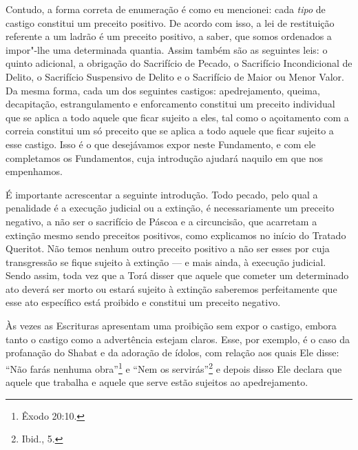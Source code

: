 Contudo, a forma correta de enumeração é como eu mencionei: cada
\emph{tipo} de castigo constitui um preceito positivo. De acordo com
isso, a lei de restituição referente a um ladrão é um preceito positivo,
a saber, que somos ordenados a impor"-lhe uma determinada quantia. Assim
também são as seguintes leis: o quinto adicional, a obrigação do
Sacrifício de Pecado, o Sacrifício
Incondicional de Delito, o Sacrifício Suspensivo de Delito e o
Sacrifício de Maior ou Menor Valor. Da mesma forma, cada um dos
seguintes castigos: apedrejamento, queima, decapitação, estrangulamento
e enforcamento constitui um preceito individual que se aplica a todo
aquele que ficar sujeito a eles, tal como o açoitamento com a correia
constitui um só preceito que se aplica a todo aquele que ficar sujeito a
esse castigo. Isso é o que desejávamos expor neste Fundamento, e com
ele completamos os Fundamentos, cuja introdução ajudará naquilo em que
nos empenhamos.

É importante acrescentar a seguinte introdução. Todo pecado, pelo qual a
penalidade é a execução judicial ou a extinção, é necessariamente um
preceito negativo, a não ser o sacrifício de Páscoa e a circuncisão, que
acarretam a extinção mesmo sendo preceitos positivos, como explicamos
no início do Tratado Queritot\starr. Não temos nenhum outro preceito positivo
a não ser esses por cuja transgressão se fique sujeito à extinção --- e
mais ainda, à execução judicial. Sendo assim, toda vez que a Torá\starr{}
disser que aquele que cometer um determinado ato deverá ser morto ou
estará sujeito à extinção saberemos perfeitamente que esse ato
específico está proibido e constitui um preceito negativo.

Às vezes as Escrituras apresentam uma proibição sem expor o castigo,
embora tanto o castigo como a advertência estejam claros. Esse, por
exemplo, é o caso da profanação do Shabat e da adoração de ídolos, com
relação aos quais Ele disse: ``Não farás nenhuma obra''\footnote{Êxodo 20:10.} e
``Nem os servirás''\footnote{Ibid., 5.} e depois disso Ele declara que aquele
que trabalha e aquele que serve estão sujeitos ao apedrejamento.


